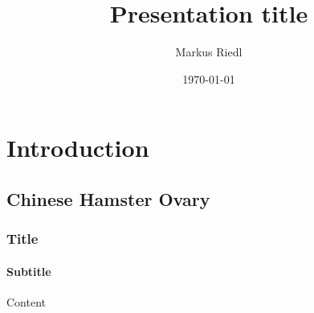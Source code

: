 \documentclass[aspectratio=169]{beamer}
\title{Presentation title}
\author{Markus Riedl}
\date{\today}
\begin{document}
\begin{frame}
\titlepage
\end{frame}

\section{Introduction}

\subsection{Chinese Hamster Ovary}

\begin{frame}
    \frametitle{Title}
    \framesubtitle{Subtitle}

    Content
\end{frame}
\end{document}

